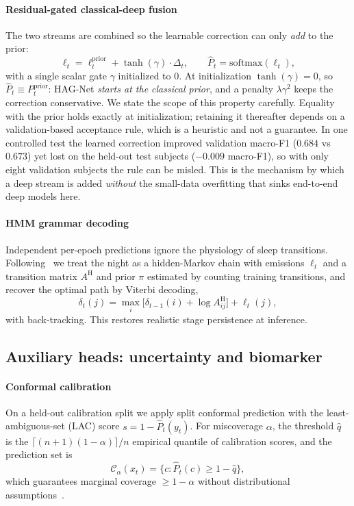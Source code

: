 \documentclass[journal]{IEEEtran}
\begin{document}
\paragraph{Residual-gated classical-deep fusion}
The two streams are combined so the learnable correction can only \emph{add} to the
prior:
\begin{equation}
\label{eq:fusion}
\ell_t = \ell^{\mathrm{prior}}_t + \tanh(\gamma)\cdot\Delta_t,
\qquad \hat P_t=\mathrm{softmax}(\ell_t),
\end{equation}
with a single scalar gate $\gamma$ initialized to $0$. At initialization
$\tanh(\gamma)=0$, so $\hat P_t\equiv P^{\mathrm{prior}}_t$: HAG-Net \emph{starts at
the classical prior}, and a penalty $\lambda\gamma^2$ keeps the correction
conservative. We state the scope of this property carefully. Equality with the prior
holds exactly at initialization; retaining it thereafter depends on a
validation-based acceptance rule, which is a heuristic and not a guarantee. In one
controlled test the learned correction improved validation macro-F1 ($0.684$ vs
$0.673$) yet lost on the held-out test subjects ($-0.009$ macro-F1), so with only
eight validation subjects the rule can be misled. This is the mechanism by which
a deep stream is added \emph{without} the small-data overfitting that sinks
end-to-end deep models here.

\paragraph{HMM grammar decoding}
Independent per-epoch predictions ignore the physiology of sleep transitions.
Following~\cite{chen2024hmm} we treat the night as a hidden-Markov chain with
emissions $\ell_t$ and a transition matrix $A^{\mathrm{H}}$ and prior $\pi$
estimated by counting training transitions, and recover the optimal path by Viterbi
decoding,
\begin{equation}
\delta_t(j)=\max_i\big[\delta_{t-1}(i)+\log A^{\mathrm{H}}_{ij}\big]+\ell_t(j),
\end{equation}
with back-tracking. This restores realistic stage persistence at inference.

\subsection{Auxiliary heads: uncertainty and biomarker}
\paragraph{Conformal calibration}
On a held-out calibration split we apply split conformal prediction with the
least-ambiguous-set (LAC) score $s=1-\hat P_t(y_t)$. For miscoverage $\alpha$, the
threshold $\hat q$ is the $\lceil(n{+}1)(1{-}\alpha)\rceil/n$ empirical quantile of
calibration scores, and the prediction set is
\begin{equation}
\mathcal{C}_\alpha(x_t)=\{c:\hat P_t(c)\ge 1-\hat q\},
\end{equation}
which guarantees marginal coverage $\ge 1-\alpha$ without distributional
assumptions~\cite{angelopoulos2023conformal}.
\end{document}

